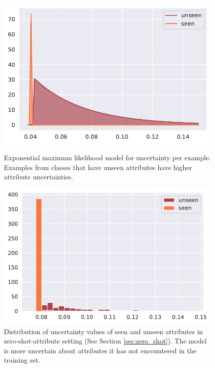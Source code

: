 \documentclass[a4paper,cleardoubleempty,BCOR1cm, 11pt]{report}
\begin{document}
\begin{figure}[t!]
	\centering
	\begin{minipage}{0.45\textwidth}
		\centering
		\includegraphics[width=1\textwidth]{images/zero_shot_class_uncertainty.pdf} 
		\caption{Exponential maximum likelihood model for uncertainty per example. Examples from classes that have unseen attributes have higher attribute uncertainties.}
		\label{fig:unseen_attr_classes}
	\end{minipage}\hfill
	\begin{minipage}{0.45\textwidth}
		\centering
		\includegraphics[width=1\textwidth]{images/zero_shot_attr_uncertainty_hist.pdf}
		\caption{Distribution of uncertainty values of seen and unseen attributes in zero-shot-attribute setting (See Section \ref{sec:zero_shot}). The model is more uncertain about attributes it has not encountered in the training set.}
		\label{fig:unseen_attrs}
	\end{minipage}
\end{figure}
\end{document}
